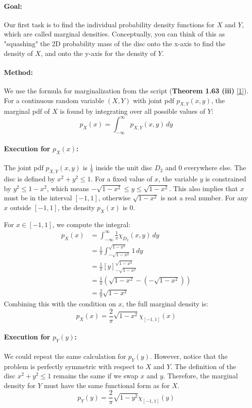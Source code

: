 \documentclass[11pt,a4paper]{article}
\theoremstyle{mystyle}
\begin{document}
\paragraph{Goal:} Our first task is to find the individual probability density functions for $X$ and $Y$, which are called marginal densities. Conceptually, you can think of this as "squashing" the 2D probability mass of the disc onto the x-axis to find the density of $X$, and onto the y-axis for the density of $Y$.

\paragraph{Method:} We use the formula for marginalization from the script (\textbf{Theorem 1.63 (iii)} \hyperlink{note1}{[1]}). For a continuous random variable $(X,Y)$ with joint pdf $p_{X,Y}(x,y)$, the marginal pdf of $X$ is found by integrating over all possible values of $Y$:
\[
p_X(x) = \int_{-\infty}^{\infty} p_{X,Y}(x,y) \, dy
\]

\paragraph{Execution for $p_X(x)$:}
The joint pdf $p_{X,Y}(x,y)$ is $\frac{1}{\pi}$ inside the unit disc $D_2$ and $0$ everywhere else. The disc is defined by $x^2 + y^2 \leq 1$.
For a fixed value of $x$, the variable $y$ is constrained by $y^2 \leq 1 - x^2$, which means $-\sqrt{1-x^2} \leq y \leq \sqrt{1-x^2}$. This also implies that $x$ must be in the interval $[-1, 1]$, otherwise $\sqrt{1-x^2}$ is not a real number. For any $x$ outside $[-1,1]$, the density $p_X(x)$ is $0$.

For $x \in [-1, 1]$, we compute the integral:
\begin{align*}
p_X(x) &= \int_{-\infty}^{\infty} \frac{1}{\pi} \chi_{D_2}(x, y) \, dy \\
&= \frac{1}{\pi} \int_{-\sqrt{1-x^2}}^{\sqrt{1-x^2}} 1 \, dy \\
&= \frac{1}{\pi} \left[ y \right]_{-\sqrt{1-x^2}}^{\sqrt{1-x^2}} \\
&= \frac{1}{\pi} \left( \sqrt{1-x^2} - (-\sqrt{1-x^2}) \right) \\
&= \frac{2}{\pi} \sqrt{1-x^2}
\end{align*}
Combining this with the condition on $x$, the full marginal density is:
\[
p_X(x) = \frac{2}{\pi} \sqrt{1-x^2} \chi_{[-1,1]}(x)
\]

\paragraph{Execution for $p_Y(y)$:}
We could repeat the same calculation for $p_Y(y)$. However, notice that the problem is perfectly symmetric with respect to $X$ and $Y$. The definition of the disc $x^2 + y^2 \leq 1$ remains the same if we swap $x$ and $y$. Therefore, the marginal density for $Y$ must have the same functional form as for $X$.
\[
p_Y(y) = \frac{2}{\pi} \sqrt{1-y^2} \chi_{[-1,1]}(y)
\]
\end{document}

